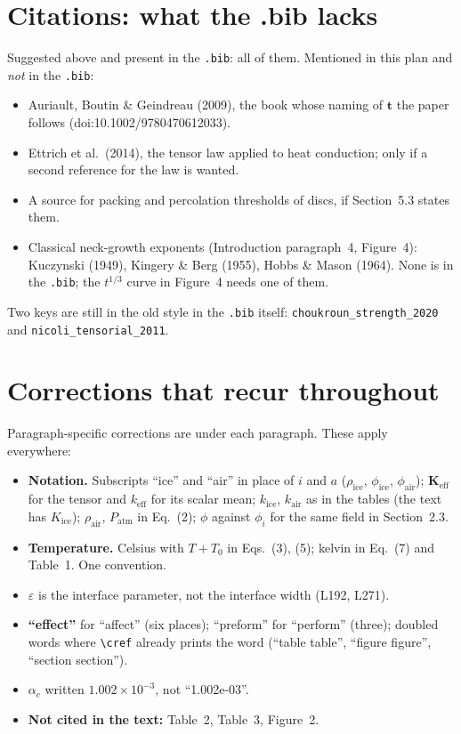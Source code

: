\documentclass[11pt]{article}
\begin{document}
\section*{Citations: what the .bib lacks}
Suggested above and present in the \texttt{.bib}: all of them. Mentioned in
this plan and \emph{not} in the \texttt{.bib}:
\begin{itemize}
\item Auriault, Boutin \& Geindreau (2009), the book whose naming of
  $\mathbf{t}$ the paper follows (doi:10.1002/9780470612033).
\item Ettrich et al.\ (2014), the tensor law applied to heat conduction;
  only if a second reference for the law is wanted.
\item A source for packing and percolation thresholds of discs, if
  Section~5.3 states them.
\item Classical neck-growth exponents (Introduction paragraph~4,
  Figure~4): Kuczynski (1949), Kingery \& Berg (1955), Hobbs \& Mason
  (1964). None is in the \texttt{.bib}; the $t^{1/3}$ curve in Figure~4
  needs one of them.
\end{itemize}
Two keys are still in the old style in the \texttt{.bib} itself:
\texttt{choukroun\_strength\_2020} and \texttt{nicoli\_tensorial\_2011}.

\section*{Corrections that recur throughout}
Paragraph-specific corrections are under each paragraph. These apply
everywhere:
\begin{itemize}
\item \textbf{Notation.} Subscripts ``ice'' and ``air'' in place of $i$ and
  $a$ ($\rho_{\mathrm{ice}}$, $\phi_{\mathrm{ice}}$, $\phi_{\mathrm{air}}$);
  $\mathbf{K}_{\mathrm{eff}}$ for the tensor and $k_{\mathrm{eff}}$ for its
  scalar mean; $k_{\mathrm{ice}}$, $k_{\mathrm{air}}$ as in the tables (the
  text has $K_{\mathrm{ice}}$); $\rho_{\mathrm{air}}$, $P_{\mathrm{atm}}$ in
  Eq.~(2); $\phi$ against $\phi_i$ for the same field in Section~2.3.
\item \textbf{Temperature.} Celsius with $T + T_0$ in Eqs.~(3), (5); kelvin
  in Eq.~(7) and Table~1. One convention.
\item \textbf{$\varepsilon$} is the interface parameter, not the interface
  width (L192, L271).
\item \textbf{``effect''} for ``affect'' (six places); ``preform'' for
  ``perform'' (three); doubled words where \verb|\cref| already prints the
  word (``table table'', ``figure figure'', ``section section'').
\item \textbf{$\alpha_c$} written $1.002\times10^{-3}$, not ``1.002e-03''.
\item \textbf{Not cited in the text:} Table~2, Table~3, Figure~2.
\end{itemize}
\end{document}
